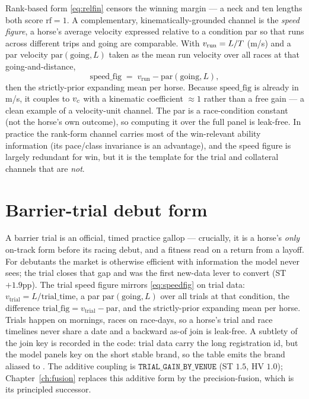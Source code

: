 Rank-based form \eqref{eq:relfin} censors the winning margin --- a neck and ten lengths both
score $\mathrm{rf}=1$. A complementary, kinematically-grounded channel is the \emph{speed figure},
a horse's average velocity expressed relative to a condition par so that runs across different
trips and going are comparable. With $v_{\text{run}} = L/T$ (m/s) and a par velocity
$\mathrm{par}(\text{going},L)$ taken as the mean run velocity over all races at that
going-and-distance,
\begin{equation}
  \mathrm{speed\_fig} \;=\; v_{\text{run}} - \mathrm{par}(\text{going},L),
  \label{eq:speedfig}
\end{equation}
then the strictly-prior expanding mean per horse. Because $\mathrm{speed\_fig}$ is already in m/s,
it couples to ${v_{c}}$ with a kinematic coefficient $\approx 1$ rather than a free gain --- a clean
example of a velocity-unit channel. The par is a race-condition constant (not the horse's own
outcome), so computing it over the full panel is leak-free. In practice the rank-form channel
carries most of the win-relevant ability information (its pace/class invariance is an advantage),
and the speed figure is largely redundant for win, but it is the template for the trial and
collateral channels that are \emph{not}.

\section{Barrier-trial debut form}
\label{sec:trial}

A barrier trial is an official, timed practice gallop --- crucially, it is a horse's \emph{only}
on-track form before its racing debut, and a fitness read on a return from a layoff. For debutants
the market is otherwise efficient with information the model never sees; the trial closes that gap
and was the first new-data lever to convert (ST $+1.9$pp). The trial speed figure mirrors
\eqref{eq:speedfig} on trial data: $v_{\text{trial}} = L/\text{trial\_time}$, a par
$\mathrm{par}(\text{going},L)$ over all trials at that condition, the difference
$\mathrm{trial\_fig} = v_{\text{trial}}-\mathrm{par}$, and the strictly-prior expanding mean per
horse. Trials happen on mornings, races on race-days, so a horse's trial and race timelines never
share a date and a backward as-of join is leak-free. A subtlety of the join key is recorded in the
code: trial data carry the long registration id, but the model panels key on the short stable
brand, so the table emits the brand aliased to . The additive coupling is
$\texttt{TRIAL\_GAIN\_BY\_VENUE}$ (ST $1.5$, HV $1.0$); Chapter~\ref{ch:fusion} replaces this
additive form by the precision-fusion, which is its principled successor.

